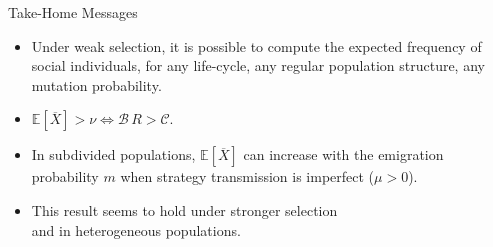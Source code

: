 \documentclass[aspectratio=169]{beamer}
\begin{document}
\begin{frame}{Take-Home Messages}


\begin{center}
\begin{minipage}{0.9\textwidth}

\begin{itemize}
\item<+-> Under weak selection, it is
possible to compute the expected frequency of social
individuals, for any life-cycle, any regular population structure,  any mutation probability. 

\item<+-> $\mathbb{E}[\overline{X}]>\nu \Leftrightarrow \mathcal{B}\, R > \mathcal{C}$.

\item<+-> In subdivided populations, $\mathbb{E}[\overline{X}]$ can increase with the emigration probability $m$ when strategy transmission is imperfect ($\mu > 0$).  


\item<+-> This result seems to hold under stronger selection \\and in heterogeneous populations.
\end{itemize}
\end{minipage}
\end{center}


\end{frame}
\end{document}
